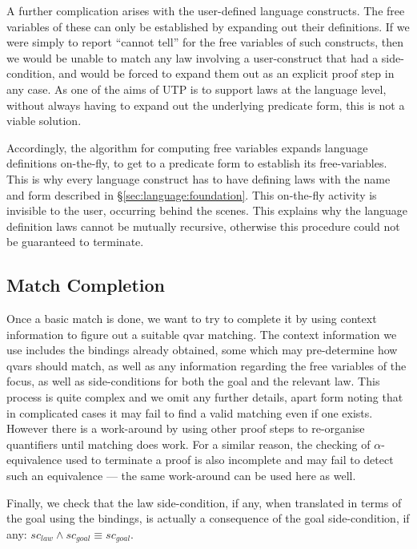 A further complication arises with the user-defined language constructs.
The free variables of these can only be established by expanding out their
definitions.
If we were simply to report ``cannot tell'' for the free variables
of such constructs,
then we would be unable to match any law involving
a user-construct that had a side-condition,
and would be forced to expand them out as an explicit proof step in any case.
As one of the aims of UTP is to support laws at the language level,
without always having to expand out the underlying predicate form,
this is not a viable solution.

Accordingly, the algorithm for computing free variables
expands language definitions on-the-fly, to get to a predicate form
to establish its free-variables.
This is why every language construct has to have defining laws
with the name and form described in \S\ref{sec:language:foundation}.
This on-the-fly activity is invisible to the user, occurring behind the scenes.
This explains why the language definition laws cannot be mutually recursive,
otherwise this procedure could not be guaranteed to terminate.


\subsection{Match Completion}
\label{ssec:match:completion}

Once a basic match is done,
we want to try to complete it by using context information
to figure out a suitable qvar matching.
The context information we use includes the bindings already obtained,
some which may pre-determine how qvars should match,
as well as any information regarding the free variables of
the focus, as well as side-conditions for both the goal and the relevant law.
This process is quite complex and we omit any further details,
apart form noting that in complicated cases it may fail to find a valid matching
even if one exists.
However there is a work-around by using other proof steps
to re-organise quantifiers until matching does work.
For a similar reason, the checking of $\alpha$-equivalence
used to terminate a proof is also incomplete and may fail to detect
such an equivalence --- the same work-around can be used here as well.

Finally, we check that the law side-condition, if any,
when translated in terms of the goal using the bindings,
is actually a consequence of the goal side-condition, if any:
$sc_{law} \land sc_{goal} \equiv sc_{goal}$.
